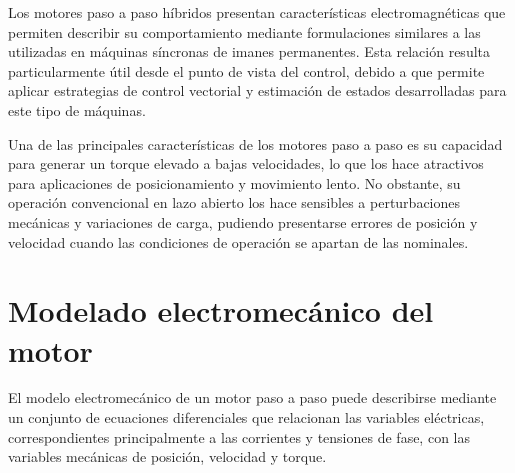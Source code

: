 Los motores paso a paso híbridos presentan características electromagnéticas 
que permiten describir su comportamiento mediante formulaciones similares a 
las utilizadas en máquinas síncronas de imanes permanentes. Esta relación 
resulta particularmente útil desde el punto de vista del control, debido a que 
permite aplicar estrategias de control vectorial y estimación de estados 
desarrolladas para este tipo de máquinas.

Una de las principales características de los motores paso a paso es su 
capacidad para generar un torque elevado a bajas velocidades, lo que los hace 
atractivos para aplicaciones de posicionamiento y movimiento lento. No 
obstante, su operación convencional en lazo abierto los hace sensibles a 
perturbaciones mecánicas y variaciones de carga, pudiendo presentarse errores 
de posición y velocidad cuando las condiciones de operación se apartan de las 
nominales.

%
%



\section{Modelado electromecánico del motor}

%
%

El modelo electromecánico de un motor paso a paso puede describirse mediante 
un conjunto de ecuaciones diferenciales que relacionan las variables 
eléctricas, correspondientes principalmente a las corrientes y tensiones de 
fase, con las variables mecánicas de posición, velocidad y torque.

